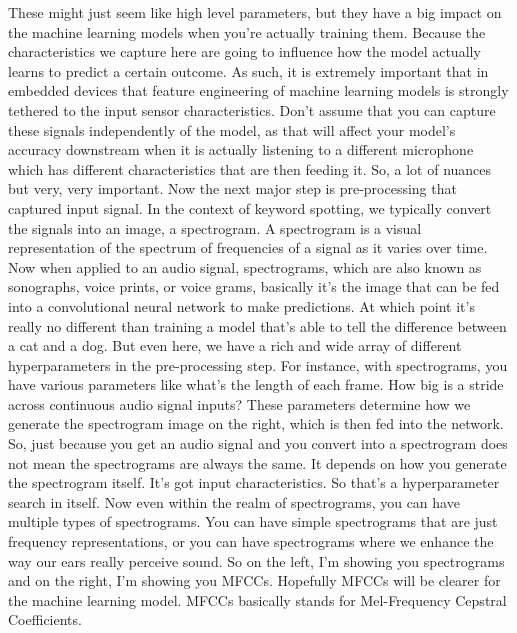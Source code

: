     These might just seem like high level parameters,
    but they have a big impact on the machine learning models
    when you're actually training them.
    Because the characteristics we capture here
    are going to influence how the model actually
    learns to predict a certain outcome.
    As such, it is extremely important that in embedded devices
    that feature engineering of machine learning models
    is strongly tethered to the input sensor characteristics.
    Don't assume that you can capture these signals independently of the model,
    as that will affect your model's accuracy downstream when it is actually
    listening to a different microphone which
    has different characteristics that are then feeding it.
    So, a lot of nuances but very, very important.
    Now the next major step is pre-processing that captured input
    signal.
    In the context of keyword spotting, we typically convert the signals
    into an image, a spectrogram.
    A spectrogram is a visual representation of the spectrum of frequencies
    of a signal as it varies over time.
    Now when applied to an audio signal, spectrograms,
    which are also known as sonographs, voice prints, or voice grams,
    basically it's the image that can be fed into a convolutional neural network
    to make predictions.
    At which point it's really no different than training
    a model that's able to tell the difference between a cat and a dog.
    But even here, we have a rich and wide array of different hyperparameters
    in the pre-processing step.
    For instance, with spectrograms, you have various parameters
    like what's the length of each frame.
    How big is a stride across continuous audio signal inputs?
    These parameters determine how we generate the spectrogram image
    on the right, which is then fed into the network.
    So, just because you get an audio signal and you convert into a spectrogram
    does not mean the spectrograms are always the same.
    It depends on how you generate the spectrogram itself.
    It's got input characteristics.
    So that's a hyperparameter search in itself.
    Now even within the realm of spectrograms,
    you can have multiple types of spectrograms.
    You can have simple spectrograms that are just frequency representations,
    or you can have spectrograms where we enhance
    the way our ears really perceive sound.
    So on the left, I'm showing you spectrograms and on the right,
    I'm showing you MFCCs.
    Hopefully MFCCs will be clearer for the machine learning model.
    MFCCs basically stands for Mel-Frequency Cepstral Coefficients.
